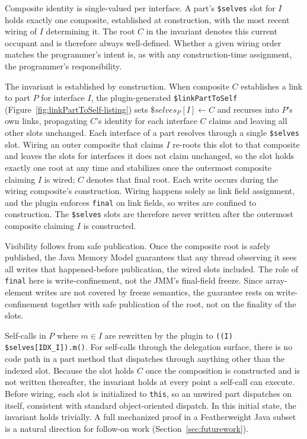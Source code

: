 \documentclass[acmsmall,nonacm]{acmart}
\theoremstyle{acmplain}
\newcommand{\code}[1]{\texttt{#1}}
\begin{document}
Composite identity is single-valued per interface. A part's \code{\$selves} slot for $I$ holds exactly one composite, established
at construction, with the most recent wiring of $I$ determining it. The root $C$ in the invariant denotes this current occupant
and is therefore always well-defined. Whether a given wiring order matches the programmer's intent is, as with any construction-time
assignment, the programmer's responsibility.

The invariant is established by construction. When composite $C$ establishes
a link to part $P$ for interface $I$, the plugin-generated
\code{\$linkPartToSelf} (Figure~\ref{fig:linkPartToSelf-listing}) sets $\$\mathit{selves}_P[I] \leftarrow C$ and
recurses into $P$'s own links, propagating $C$'s identity for each interface
$C$ claims and leaving all other slots unchanged. Each interface of a part resolves
through a single \code{\$selves} slot. Wiring an outer composite that claims
$I$ re-roots this slot to that composite and leaves the slots for interfaces it
does not claim unchanged, so the slot holds exactly one root at any time and
stabilizes once the outermost composite claiming $I$ is wired; $C$ denotes that
final root. Each write occurs during the wiring composite's construction. Wiring happens solely
as link field assignment, and the plugin enforces \code{final} on link
fields, so writes are confined to construction. The \code{\$selves} slots are therefore never
written after the outermost composite claiming $I$ is constructed.

Visibility follows from safe publication. Once the composite root is safely published, the
Java Memory Model guarantees that any thread observing it sees all writes that
happened-before publication, the wired slots included. The role of \code{final}
here is write-confinement, not the JMM's final-field freeze. Since array-element writes
are not covered by freeze semantics, the guarantee rests on write-confinement
together with safe publication of the root, not on the finality of the slots.

Self-calls in $P$ where $m \in I$ are rewritten by the plugin to \code{((I)\,\$selves[IDX\_I]).m()}.
For self-calls through the delegation surface, there is no code path in a
part method that dispatches through anything other than the indexed
slot. Because the slot holds $C$ once the composition is constructed and is not
written thereafter, the invariant holds at every point a self-call can execute.
Before wiring, each slot is initialized to \code{this}, so an unwired part
dispatches on itself, consistent with standard object-oriented dispatch. In this
initial state, the invariant holds trivially. A full mechanized proof in a Featherweight
Java subset is a natural direction for follow-on work (Section~\ref{sec:futurework}).
\end{document}
